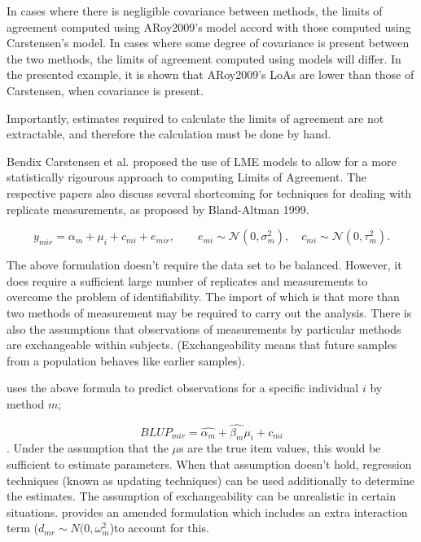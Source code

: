 \documentclass[12pt, a4paper]{report}
\theoremstyle{plain}
\theoremstyle{definition}
\theoremstyle{remark}
\begin{document}
	In cases where there is negligible covariance between methods, the limits of agreement computed using ARoy2009's model accord with those computed using Carstensen's model. In cases where some degree of
	covariance is present between the two methods, the limits of agreement computed using models will differ. In the presented
	example, it is shown that ARoy2009's LoAs are lower than those of Carstensen, when covariance is present.
	
	Importantly, estimates required to calculate the limits of agreement are not extractable, and therefore the calculation must
	be done by hand.
	
	
	Bendix Carstensen et al. proposed the use of LME models to allow for a more statistically rigourous approach to computing Limits of Agreement.  The respective papers also discuss several shortcoming for techniques for dealing with replicate measurements, as proposed by Bland-Altman 1999.
	
	
	
	\begin{equation}
	y_{mir}  = \alpha_{m} + \mu_{i} + c_{mi} + e_{mir}, \qquad  e_{mi}
	\sim \mathcal{N}(0,\sigma^{2}_{m}), \quad c_{mi} \sim \mathcal{N}(0,\tau^{2}_{m}).
	\end{equation}
	
	
	The above formulation doesn't require the data set to be balanced.
	However, it does require a sufficient large number of replicates
	and measurements to overcome the problem of identifiability. The
	import of which is that more than two methods of measurement may
	be required to carry out the analysis. There is also the
	assumptions that observations of measurements by particular
	methods are exchangeable within subjects. (Exchangeability means
	that future samples from a population behaves like earlier
	samples).
	
	
	\citet{BXC2004} uses the above formula to predict observations for
	a specific individual $i$ by method $m$;
	
	\begin{equation}BLUP_{mir} = \hat{\alpha_{m}} + \hat{\beta_{m}}\mu_{i} +
	c_{mi} \end{equation}. Under the assumption that the $\mu$s are
	the true item values, this would be sufficient to estimate
	parameters. When that assumption doesn't hold, regression
	techniques (known as updating techniques) can be used additionally
	to determine the estimates. The assumption of exchangeability can
	be unrealistic in certain situations. \citet{BXC2004} provides an
	amended formulation which includes an extra interaction term ($
	d_{mr} \sim N(0,\omega^{2}_{m}$)to account for this.
	
\end{document}
